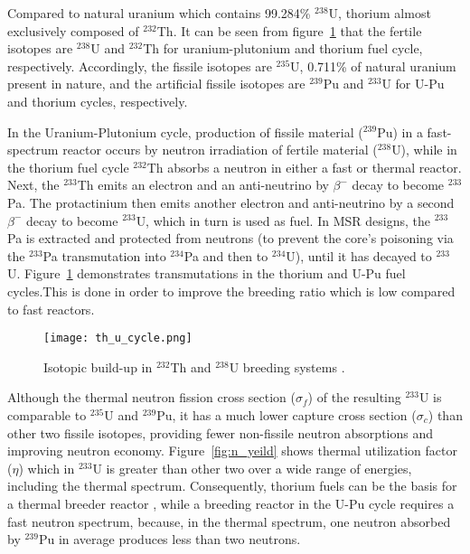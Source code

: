 Compared to natural uranium which contains 99.284\% $^{238}$U, thorium almost exclusively composed of $^{232}$Th. It can be seen from figure~\ref{fig:th_cycle} that the fertile isotopes are $^{238}$U and $^{232}$Th for uranium-plutonium and thorium fuel cycle, respectively. Accordingly, the fissile isotopes are $^{235}$U, 0.711\% of natural uranium present in nature, and the artificial fissile isotopes are $^{239}$Pu and $^{233}$U for U-Pu and thorium cycles, respectively. 

In the Uranium-Plutonium cycle, production of fissile material ($^{239}$Pu) in a fast-spectrum reactor occurs by neutron irradiation of fertile material ($^{238}$U), while in the thorium fuel cycle $^{232}$Th absorbs a neutron in either a fast or thermal reactor. Next, the $^{233}$Th emits an electron and an anti-neutrino by $\beta^-$ decay to become $^{233}$Pa. The protactinium then emits another electron and anti-neutrino by a second $\beta^-$ decay to become $^{233}$U, which in turn is used as fuel. In \gls{MSR} designs, the $^{233}$Pa is extracted and protected from neutrons (to prevent the core's poisoning via the $^{233}$Pa transmutation into $^{234}$Pa and then to $^{234}$U), until it has decayed to $^{233}$U. Figure~\ref{fig:th_cycle} demonstrates transmutations in the thorium and U-Pu fuel cycles.This is done in order to improve the breeding ratio which is low compared to fast reactors. 

\begin{figure}[t] %
  \centering
  \vspace{-0.3em}
  \texttt{[image: th\_u\_cycle.png]}
  \caption{Isotopic build-up in $^{232}$Th and $^{238}$U breeding systems \cite{eschbach_possible_1966}.}
  \vspace{-0.6em}
  \label{fig:th_cycle}
\end{figure}
\FloatBarrier

Although the thermal neutron fission cross section ($\sigma_f$) of the resulting $^{233}$U is comparable to $^{235}$U and $^{239}$Pu, it has a much lower capture cross section ($\sigma_c$) than other two fissile isotopes, providing fewer non-fissile neutron absorptions and improving neutron economy. Figure~\ref{fig:n_yeild} shows thermal utilization factor ($\eta$) which in $^{233}$U is greater than other two over a wide range of energies, including the thermal spectrum. Consequently, thorium fuels can be the basis for a thermal breeder reactor \cite{iaea_thorium_2005}, while a breeding reactor in the U-Pu cycle requires a fast neutron spectrum, because, in the thermal spectrum, one neutron absorbed by $^{239}$Pu in average produces less than two neutrons.

